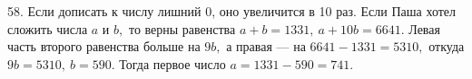 58. Если дописать к числу лишний 0, оно увеличится в 10 раз. Если Паша хотел сложить числа $a$ и $b,$ то верны равенства $a+b=1331,\ a+10b=6641.$ Левая часть второго равенства больше на $9b,$ а правая --- на $6641-1331=5310,$ откуда $9b=5310,\ b=590.$ Тогда первое число $a=1331-590=741.$\\
